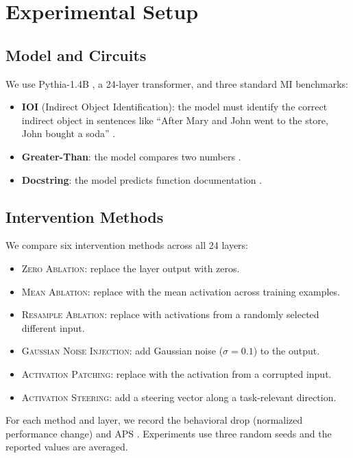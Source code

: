 \documentclass[pdflatex,sn-mathphys-num]{sn-jnl}
\newcommand{\method}[1]{\textsc{#1}}
\begin{document}
\section{Experimental Setup}

\subsection{Model and Circuits}

We use Pythia-1.4B \citep{Biderman2023}, a 24-layer transformer, and three standard MI benchmarks:
\begin{itemize}
    \item \textbf{IOI} (Indirect Object Identification): the model must identify the correct indirect object in sentences like ``After Mary and John went to the store, John bought a soda'' \citep{Wang2022}.
    \item \textbf{Greater-Than}: the model compares two numbers \citep{Nanda2023}.
    \item \textbf{Docstring}: the model predicts function documentation \citep{HeimersheimJaniak2023}.
\end{itemize}

\subsection{Intervention Methods}

We compare six intervention methods across all 24 layers:
\begin{itemize}
    \item \method{Zero Ablation}: replace the layer output with zeros.
    \item \method{Mean Ablation}: replace with the mean activation across training examples.
    \item \method{Resample Ablation}: replace with activations from a randomly selected different input.
    \item \method{Gaussian Noise Injection}: add Gaussian noise ($\sigma=0.1$) to the output.
    \item \method{Activation Patching}: replace with the activation from a corrupted input.
    \item \method{Activation Steering}: add a steering vector along a task-relevant direction.
\end{itemize}

For each method and layer, we record the behavioral drop (normalized performance change) and APS \citep{Liu2025}. Experiments use three random seeds and the reported values are averaged.
\end{document}
